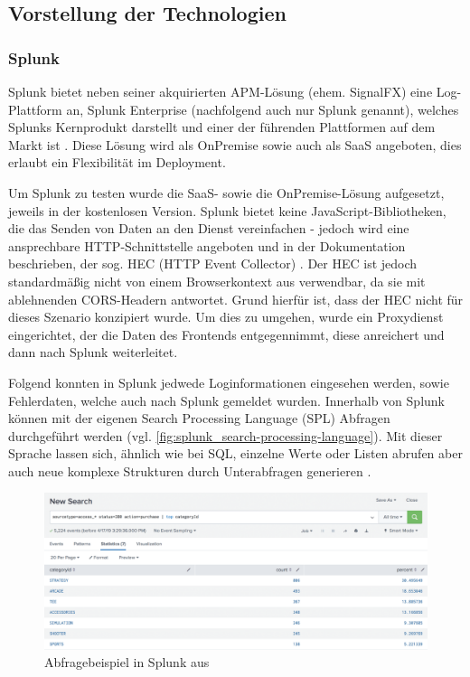 

\subsection{Vorstellung der Technologien}

\subsubsection{Splunk}
\label{subsec:splunk}

Splunk bietet neben seiner akquirierten APM-Lösung (ehem. SignalFX) eine Log-Plattform an, Splunk Enterprise (nachfolgend auch nur Splunk genannt), welches Splunks Kernprodukt darstellt und einer der führenden Plattformen auf dem Markt ist \cite{ThreatIdentificationFromAccessLogsUsingElasticStack}. Diese Lösung wird als OnPremise sowie auch als SaaS angeboten, dies erlaubt ein Flexibilität im Deployment.

Um Splunk zu testen wurde die SaaS- sowie die OnPremise-Lösung aufgesetzt, jeweils in der kostenlosen Version. Splunk bietet keine JavaScript-Bibliotheken, die das Senden von Daten an den Dienst vereinfachen - jedoch wird eine ansprechbare HTTP-Schnittstelle angeboten und in der Dokumentation beschrieben, der sog. HEC (HTTP Event Collector) \cite{SplunkHEC}. Der HEC ist jedoch standardmäßig nicht von einem Browserkontext aus verwendbar, da sie mit ablehnenden CORS-Headern antwortet. Grund hierfür ist, dass der HEC nicht für dieses Szenario konzipiert wurde. Um dies zu umgehen, wurde ein Proxydienst eingerichtet, der die Daten des Frontends entgegennimmt, diese anreichert und dann nach Splunk weiterleitet.

Folgend konnten in Splunk jedwede Loginformationen eingesehen werden, sowie Fehlerdaten, welche auch nach Splunk gemeldet wurden. Innerhalb von Splunk können mit der eigenen Search Processing Language (SPL) \cite{SplunkSPL} Abfragen durchgeführt werden (vgl. \autoref{fig:splunk_search-processing-language}). Mit dieser Sprache lassen sich, ähnlich wie bei SQL, einzelne Werte oder Listen abrufen aber auch neue komplexe Strukturen durch Unterabfragen generieren \cite{SplunkSQLtoSPL}.

\begin{figure}[H]
	\centering
	\includegraphics[width=\linewidth]{img/03_methoden/splunk_search-processing-language.png}
	\caption{Abfragebeispiel in Splunk aus \cite{SplunkSPL}}
	\label{fig:splunk_search-processing-language}
\end{figure}

